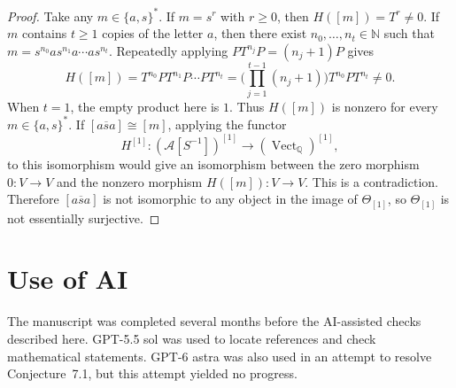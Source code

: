 \documentclass[10pt,a4paper]{amsart}
\theoremstyle{plain}
\theoremstyle{definition}
\theoremstyle{remark}
\begin{document}
\begin{proof}
  Take any $m\in\{a,s\}^*$.
  If $m=s^r$ with $r\geq0$, then $H([m])=T^r\neq0$.
  If $m$ contains $t\geq1$ copies of the letter $a$, then there exist $n_0,\ldots,n_t\in\mathbb N$ such that $m=s^{n_0}a s^{n_1}a\cdots a s^{n_t}$.
  Repeatedly applying $PT^{n_j}P=(n_j+1)P$ gives
  \[
    H([m])
    =T^{n_0}PT^{n_1}P\cdots PT^{n_t}
    =\bigg(\prod_{j=1}^{t-1}(n_j+1)\bigg)
    T^{n_0}PT^{n_t}\neq0.
  \]
  When $t=1$, the empty product here is $1$.
  Thus $H([m])$ is nonzero for every $m\in\{a,s\}^*$.
  If $[a\overline s a]\cong[m]$, applying the functor
  \[
    H^{[1]}:(\mathcal A[S^{-1}])^{[1]}
    \longrightarrow(\operatorname{Vect}_{\mathbb Q})^{[1]},
  \]
  to this isomorphism would give an isomorphism between the zero morphism $0:V\longrightarrow V$ and the nonzero morphism $H([m]):V\longrightarrow V$.
  This is a contradiction.
  Therefore $[a\overline s a]$ is not isomorphic to any object in the image of $\Theta_{[1]}$, so $\Theta_{[1]}$ is not essentially surjective.
\end{proof}

\section*{Use of AI}
The manuscript was completed several months before the AI-assisted checks described here.
GPT-5.5 sol was used to locate references and check mathematical statements.
GPT-6 astra was also used in an attempt to resolve Conjecture~7.1, but this attempt yielded no progress.
\end{document}
